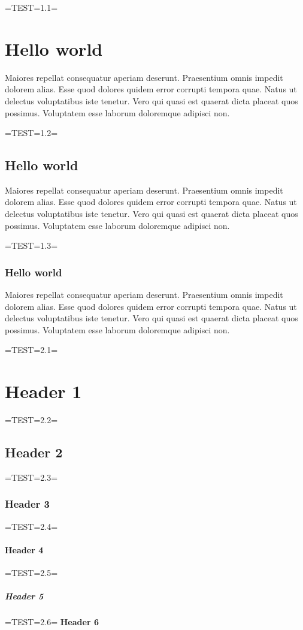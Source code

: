\documentclass[a4paper]{article}
\begin{document}
=TEST=1.1=
\section{Hello world} \label{hello-world-2}
Maiores repellat consequatur aperiam deserunt.  
Praesentium omnis impedit dolorem alias.   
Esse quod dolores quidem error corrupti tempora quae.  
Natus ut delectus voluptatibus iste tenetur.  
Vero qui quasi est quaerat dicta placeat quos possimus.  
Voluptatem esse laborum doloremque adipisci non.

=TEST=1.2=
\subsection{Hello world} \label{hello-world-1}
Maiores repellat consequatur aperiam deserunt.  
Praesentium omnis impedit dolorem alias.   
Esse quod dolores quidem error corrupti tempora quae.  
Natus ut delectus voluptatibus iste tenetur.  
Vero qui quasi est quaerat dicta placeat quos possimus.  
Voluptatem esse laborum doloremque adipisci non.

=TEST=1.3=
\subsubsection{Hello world} \label{hello-world}
Maiores repellat consequatur aperiam deserunt.  
Praesentium omnis impedit dolorem alias.   
Esse quod dolores quidem error corrupti tempora quae.  
Natus ut delectus voluptatibus iste tenetur.  
Vero qui quasi est quaerat dicta placeat quos possimus.  
Voluptatem esse laborum doloremque adipisci non.

=TEST=2.1=
\section{Header 1} \label{header-1}

=TEST=2.2=
\subsection{Header 2} \label{header-2}

=TEST=2.3=
\subsubsection{Header 3} \label{header-3}

=TEST=2.4=
\paragraph{Header 4} \label{header-4}

=TEST=2.5=
\subparagraph{Header 5} \label{header-5}

=TEST=2.6=
\textbf{Header 6} \label{header-6}
\end{document}
